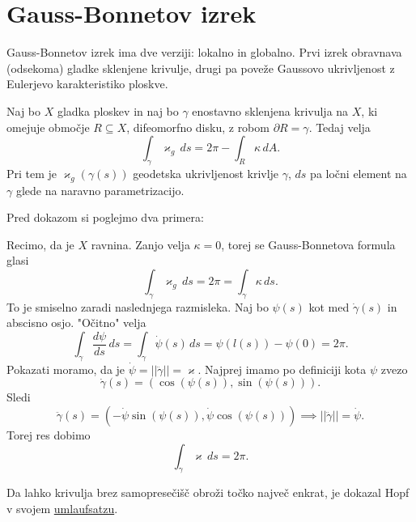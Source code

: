 \section{Gauss-Bonnetov izrek}

Gauss-Bonnetov izrek ima dve verziji: lokalno in globalno. Prvi izrek obravnava (odsekoma) gladke sklenjene krivulje, drugi pa poveže Gaussovo ukrivljenost z Eulerjevo karakteristiko ploskve.

\begin{izrek}
\label{izr_lokalna_verzija_GB_izreka}
 Naj bo $X$ gladka ploskev in naj bo $\gamma$ enostavno sklenjena krivulja na $X$, ki omejuje območje $R \subseteq  X$, difeomorfno disku, z robom $\partial R = \gamma$. 
 Tedaj velja \begin{equation*}
 \int_{\gamma} \varkappa_g \, ds = 2 \pi - \int_{R} \kappa \, dA.
 \end{equation*}  
Pri tem je $\varkappa_g(\gamma(s))$ geodetska ukrivljenost krivlje $\gamma$, $ds$ pa ločni element na $\gamma$ glede na naravno parametrizacijo. 
\end{izrek}

Pred dokazom si poglejmo dva primera:
\begin{primer}
Recimo, da je $X$ ravnina. Zanjo velja $\kappa = 0$, torej se Gauss-Bonnetova formula glasi \begin{equation*}
    \int_{\gamma} \varkappa_g \, ds = 2 \pi = \int_{\gamma} \kappa \, ds.
\end{equation*}  
To je smiselno zaradi naslednjega razmisleka. Naj bo $\psi(s)$ kot med $\dot{\gamma}(s)$ in abscisno osjo. "Očitno" velja \begin{equation*}
\int_{\gamma} \frac{ d \psi }{ ds }   \, ds = \int_{\gamma}  \dot{\psi}(s) \, ds = \psi(l(s)) - \psi(0) = 2 \pi. 
\end{equation*}
Pokazati moramo, da je $\dot{\psi} = \lvert\lvert \ddot{\gamma} \rvert\rvert = \varkappa$. Najprej imamo po definiciji kota $\psi$ zvezo \begin{equation*}
    \dot{\gamma}(s) = (\cos(\psi(s)), \sin(\psi(s))).
\end{equation*} 
Sledi \begin{equation*}
\ddot{\gamma}(s) = (- \dot{\psi} \sin(\psi(s)), \dot{\psi} \cos(\psi(s))) \implies \lvert\lvert \ddot{\gamma} \rvert\rvert = \dot{\psi}.
\end{equation*}  
Torej res dobimo \begin{equation*}
    \int_{\gamma} \varkappa \, ds = 2 \pi.
\end{equation*}  

\begin{opomba}
Da lahko krivulja brez samopresečišč obroži točko največ enkrat, je dokazal Hopf v svojem \href{https://de.wikipedia.org/wiki/Umlaufsatz}{umlaufsatzu}.  
\end{opomba}
\end{primer}


